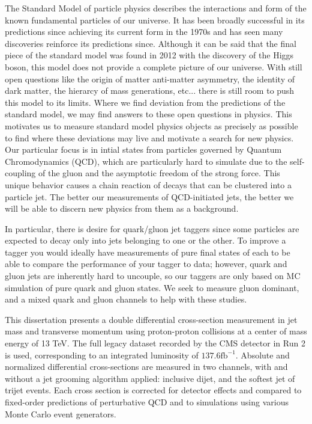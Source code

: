 
The Standard Model \cite{} of particle physics describes the interactions and form of the known fundamental particles of our universe. It has been broadly successful in its predictions since achieving its current form in the 1970s and has seen many discoveries reinforce its predictions since. Although it can be said that the final piece of the standard model was found in 2012 with the discovery of the Higgs boson, this model does not provide a complete picture of our universe. With still open questions like the origin of matter anti-matter asymmetry, the identity of dark matter, the hierarcy of mass generations, etc... there is still room to push this model to its limits. Where we find deviation from the predictions of the standard model, we may find answers to these open questions in physics. This motivates us to measure standard model physics objects as precisely as possible to find where these deviations may live and motivate a search for new physics. Our particular focus is in intial states from particles governed by Quantum Chromodynamics (QCD), which are particularly hard to simulate due to the self-coupling of the gluon and the asymptotic freedom of the strong force. This unique behavior causes a chain reaction of decays that can be clustered into a particle jet. The better our measurements of QCD-initiated jets, the better we will be able to discern new physics from them as a background.

In particular, there is desire for quark/gluon jet taggers since some particles are expected to decay only into jets belonging to one or the other. To improve a tagger you would ideally have measurements of pure final states of each to be able to compare the performance of your tagger to data; however, quark and gluon jets are inherently hard to uncouple, so our taggers are only based on MC simulation of pure quark and gluon states. We seek to measure gluon dominant, and a mixed quark and gluon channels to help with these studies.

This dissertation presents a double differential cross-section measurement in jet mass and transverse momentum using proton-proton collisions at a center of mass energy of 13 TeV. The full legacy dataset recorded by the CMS detector in Run 2 is used, corresponding to an integrated luminosity of $137.6 \text{fb}^{-1}$. Absolute and normalized differential cross-sections are measured in two channels, with and without a jet grooming algorithm applied: inclusive dijet, and the softest jet of trijet events. Each cross section is corrected for detector effects and compared to fixed-order predictions of perturbative QCD and to simulations using various Monte Carlo event generators.
